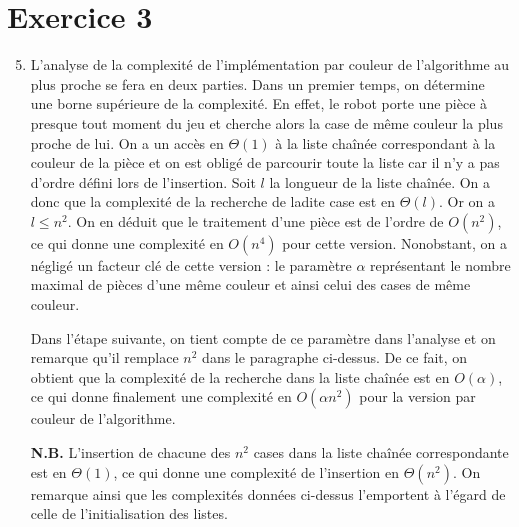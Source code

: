 \documentclass[12pt,a4paper]{article}
\begin{document}
\section{Exercice 3}
\begin{enumerate}
\setcounter{enumi}{4}
\item L'analyse de la complexit\'e de l'impl\'ementation par couleur de 
l'algorithme au plus proche se fera en deux parties. Dans un premier temps, 
on d\'etermine une borne sup\'erieure de la complexit\'e. En effet, le 
robot porte une pi\`ece \`a presque tout moment du jeu et cherche alors la 
case de m\^eme couleur la plus proche de lui. On a un acc\`es en $\Theta(1)$ \`a 
la liste cha\^in\'ee correspondant \`a la couleur de la pi\`ece et on est 
oblig\'e de parcourir toute la liste car il n'y a pas d'ordre d\'efini 
lors de l'insertion. Soit $l$ la longueur de la liste cha\^in\'ee. On a donc que 
la complexit\'e de la recherche de ladite case est en $\Theta(l)$. Or on a $l 
\leq n^2$. On en d\'eduit que le traitement d'une pi\`ece est de l'ordre de 
$O(n^2)$, ce qui donne une complexit\'e en $O(n^4)$ pour cette version. 
Nonobstant, on a n\'eglig\'e un facteur cl\'e de cette version : le param\`etre 
$\alpha$ repr\'esentant le nombre maximal de pi\`eces d'une m\^eme couleur et 
ainsi celui des cases de m\^eme couleur. \par
Dans l'\'etape suivante, on tient compte de ce param\`etre dans l'analyse 
et on remarque qu'il remplace $n^2$ dans le paragraphe ci-dessus. De ce fait, 
on obtient que la complexit\'e de la recherche dans la liste cha\^in\'ee est en 
$O(\alpha)$, ce qui donne finalement une complexit\'e en $O(\alpha n^2)$ pour la 
version par couleur de l'algorithme.

{\bfseries N.B.} L'insertion de chacune des $n^2$ cases dans la liste 
cha\^in\'ee correspondante est en $\Theta(1)$, ce qui donne une complexit\'e de 
l'insertion en $\Theta(n^2)$. On remarque ainsi que les complexit\'es donn\'ees 
ci-dessus l'emportent \`a l'\'egard de celle de l'initialisation des listes.

\end{enumerate}
\end{document}
